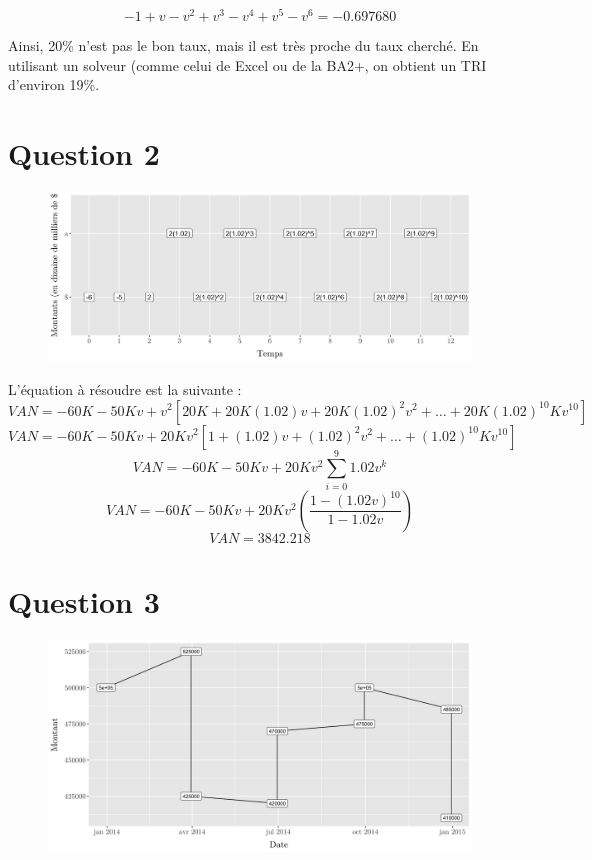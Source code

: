 \documentclass[11pt,french]{article}
\begin{document}
$$
-1 + v - v^2 + v^3 - v^4 + v^5 - v^6 = -0.697 680
$$

Ainsi, 20\% n'est pas le bon taux, mais il est très proche du taux cherché. En utilisant un solveur (comme celui de Excel ou de la BA2+, on obtient un TRI d'environ 19\%.

\section{Question 2}
\begin{figure}[h!] %
    \centering
    \includegraphics[width=1\textwidth]{Figures/figure2.png}
\end{figure}

L'équation à résoudre est la suivante :
$$
VAN = -60K -50Kv + v^2 [20K + 20K(1.02)v + 20K(1.02)^2v^2 + … + 20K(1.02)^{10}Kv^{10}]
$$
$$
VAN = -60K -50Kv + 20Kv^2 [1 + (1.02)v +(1.02)^2v^2 + … + (1.02)^{10}Kv^{10}]
$$
$$
VAN = -60K -50Kv + 20Kv^2 \sum_{i=0}^9 1.02v^k
$$
$$
VAN = -60K -50Kv + 20Kv^2 \left( \frac{1 - (1.02v)^{10}}{1 - 1.02v} \right)
$$
$$
VAN = 3842.218
$$

\section{Question 3}
\begin{figure}[h!] %
    \centering
    \includegraphics[width=1\textwidth]{Figures/figure3.png}
\end{figure}
\end{document}
